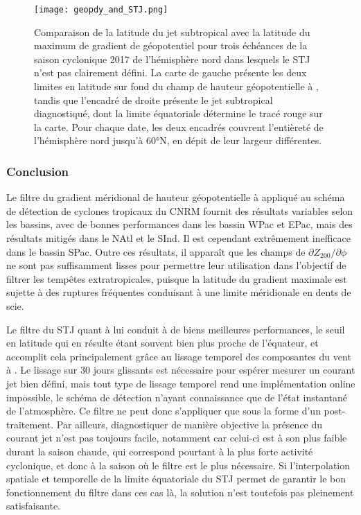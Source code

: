 \documentclass[../main.tex]{subfiles}
\begin{document}
\begin{figure}[tb]
    \centering
    \texttt{[image: geopdy\_and\_STJ.png]}
    \caption{Comparaison de la latitude du jet subtropical avec la latitude du maximum de gradient de géopotentiel pour trois échéances de la saison cyclonique
    2017 de l'hémisphère nord dans lesquels le STJ n'est pas clairement défini. La carte de gauche présente les deux limites en latitude sur fond du champ de
    hauteur géopotentielle à , tandis que l'encadré de droite présente le jet subtropical diagnostiqué, dont la limite équatoriale détermine le tracé rouge
    sur la carte. Pour chaque date, les deux encadrés couvrent l'entièreté de l'hémisphère nord jusqu'à \ang{60}N, en dépit de leur largeur différentes.}
    \label{fig:geopdy_and_STJ}
\end{figure}

\subsubsection*{Conclusion}

Le filtre du gradient méridional de hauteur géopotentielle à  appliqué au schéma de détection de cyclones tropicaux du CNRM fournit des résultats
variables selon les bassins, avec de bonnes performances dans les bassin WPac et EPac, mais des résultats mitigés dans le NAtl et le SInd. Il est cependant
extrêmement inefficace dans le bassin SPac. Outre ces résultats, il apparaît que les champs de $\partial Z_{200} / \partial \phi$ ne sont pas suffisamment
lisses pour permettre leur utilisation dans l'objectif de filtrer les tempêtes extratropicales, puisque la latitude du gradient maximale est sujette à des
ruptures fréquentes conduisant à une limite méridionale en dents de scie.

Le filtre du STJ quant à lui conduit à de biens meilleures performances, le seuil en latitude qui en résulte étant souvent bien plus proche de l'équateur, et
accomplit cela principalement grâce au lissage temporel des composantes du vent à . Le lissage sur 30 jours glissants est nécessaire pour espérer
mesurer un courant jet bien défini, mais tout type de lissage temporel rend une implémentation online impossible, le schéma de détection n'ayant connaissance
que de l'état instantané de l'atmosphère. Ce filtre ne peut donc s'appliquer que sous la forme d'un post-traitement. Par ailleurs, diagnostiquer de manière
objective la présence du courant jet n'est pas toujours facile, notamment car celui-ci est à son plus faible durant la saison chaude, qui correspond pourtant à
la plus forte activité cyclonique, et donc à la saison où le filtre est le plus nécessaire. Si l'interpolation spatiale et temporelle de la limite
équatoriale du STJ permet de garantir le bon fonctionnement du filtre dans ces cas là, la solution n'est toutefois pas pleinement satisfaisante.
\end{document}
